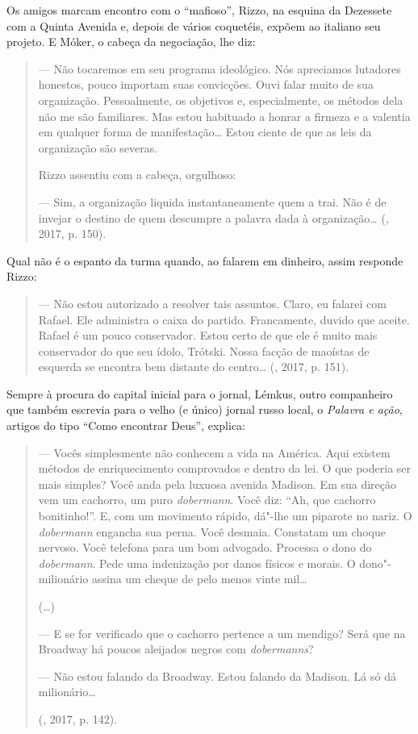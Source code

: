 Os amigos marcam encontro com o ``mafioso'', Rizzo, na esquina da
 Dezessete com a Quinta Avenida e, depois de vários coquetéis, expõem 
ao italiano seu projeto. E Móker, o cabeça da negociação, lhe diz:

\begin{quotation}
--- Não tocaremos em seu programa ideológico. Nós apreciamos lutadores honestos, pouco importam suas convicções. Ouvi falar muito de sua organização. Pessoalmente, os objetivos e, especialmente, os métodos dela não me são familiares. Mas estou habituado a honrar a firmeza e a valentia em qualquer forma de manifestação\ldots{} Estou ciente de que as leis da organização são severas.

Rizzo assentiu com a cabeça, orgulhoso:

--- Sim, a organização liquida instantaneamente quem a trai. Não é de invejar o destino de quem descumpre a palavra dada à organização\ldots{} (, 2017, p. 150).

\end{quotation}

Qual não é o espanto da turma quando, ao falarem em dinheiro, assim responde Rizzo:

\begin{quotation}

--- Não estou autorizado a resolver tais assuntos. Claro, eu falarei com Rafael. Ele administra o caixa do partido. Francamente, duvido que aceite. Rafael é um pouco conservador. Estou certo de que ele é muito mais conservador do que seu ídolo, Trótski. Nossa facção de maoístas de esquerda se encontra bem distante do centro\ldots{} (, 2017, p. 151).

\end{quotation}

Sempre à procura do capital inicial para o jornal, Lémkus, outro
companheiro que também escrevia para o velho (e único) jornal russo
local, o \emph{Palavra e ação}, artigos do tipo ``Como encontrar Deus'',
 explica:

\begin{quotation}
--- Vocês simplesmente não conhecem a vida na América. Aqui existem métodos de enriquecimento comprovados e dentro da lei. O que poderia ser mais simples? Você anda pela luxuosa avenida Madison. Em sua direção vem um cachorro, um puro \emph{dobermann}. Você diz: ``Ah, que cachorro bonitinho!''. E, com um movimento rápido, dá"-lhe um piparote no nariz. O \emph{dobermann} engancha sua perna. Você desmaia. Constatam um choque nervoso. Você telefona para um bom advogado. Processa o dono do \emph{dobermann}. Pede uma indenização por danos físicos e morais. O dono"-milionário assina um cheque de pelo menos vinte mil\ldots{}

(\ldots{})

--- E se for verificado que o cachorro pertence a um mendigo? Será que na Broadway há poucos aleijados negros com \emph{dobermanns}?

--- Não estou falando da Broadway. Estou falando da Madison. Lá só dá milionário\ldots{}

(, 2017, p. 142).

\end{quotation}

